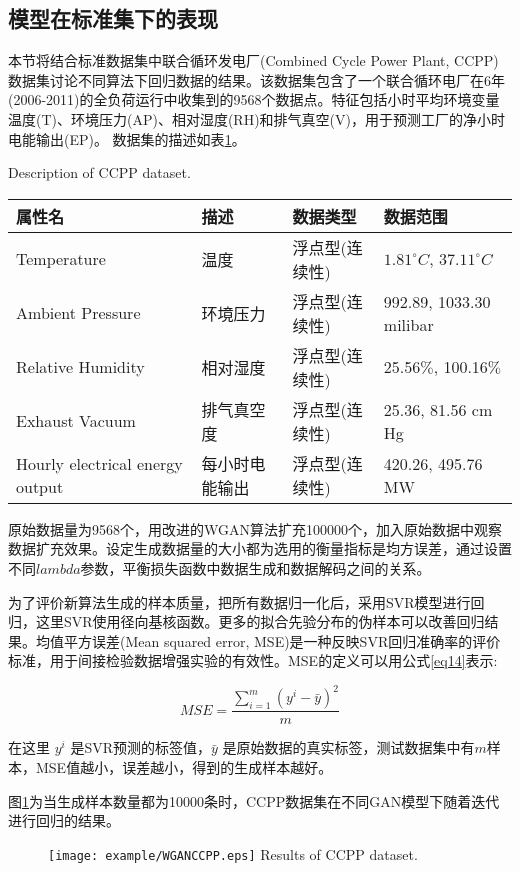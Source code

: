 \subsection{模型在标准集下的表现}
本节将结合标准数据集中联合循环发电厂(Combined Cycle Power Plant, CCPP)数据集讨论不同算法下回归数据的结果。该数据集包含了一个联合循环电厂在6年(2006-2011)的全负荷运行中收集到的9568个数据点。特征包括小时平均环境变量温度(T)、环境压力(AP)、相对湿度(RH)和排气真空(V)，用于预测工厂的净小时电能输出(EP)。
数据集的描述如表\ref{tabccpp}。
\begin{table}[htpb]
	\centering
	{Description of CCPP dataset.}
	\label{tabccpp}
	\begin{tabular}{llll} \toprule
		属性名   & 描述 & 数据类型&数据范围  \\  \midrule
		Temperature&温度&浮点型(连续性)&$1.81^\circ C$, $37.11^\circ C$\\
		Ambient Pressure&环境压力&浮点型(连续性)&992.89, 1033.30 milibar\\
		Relative Humidity&相对湿度&浮点型(连续性)& 25.56$\%$, 100.16$\%$ \\
		Exhaust Vacuum&排气真空度&浮点型(连续性)&25.36, 81.56 cm Hg\\
		Hourly electrical energy output&每小时电能输出&浮点型(连续性)&420.26, 495.76 MW\\ \bottomrule
	\end{tabular}
\end{table}

原始数据量为9568个，用改进的WGAN算法扩充100000个，加入原始数据中观察数据扩充效果。设定生成数据量的大小都为选用的衡量指标是均方误差，通过设置不同$lambda$参数，平衡损失函数中数据生成和数据解码之间的关系。

为了评价新算法生成的样本质量，把所有数据归一化后，采用SVR模型进行回归，这里SVR使用径向基核函数。更多的拟合先验分布的伪样本可以改善回归结果。均值平方误差(Mean squared error, MSE)是一种反映SVR回归准确率的评价标准，用于间接检验数据增强实验的有效性。MSE的定义可以用公式\ref{eq14}表示:

\begin{equation}
\label{eq14}
MSE=\frac{\sum \limits_{i=1}^m (y^{i}-\bar{y})^{2}}{m}
\end{equation}

在这里 $y^{i}$ 是SVR预测的标签值，$\bar{y}$ 是原始数据的真实标签，测试数据集中有$m$样本，MSE值越小，误差越小，得到的生成样本越好。

图\ref{figCCPP}为当生成样本数量都为10000条时，CCPP数据集在不同GAN模型下随着迭代进行回归的结果。
\begin{figure}[htbp]
	\centering
	\texttt{[image: example/WGANCCPP.eps]}
	{Results of CCPP dataset.}
	\label{figCCPP}
\end{figure}

